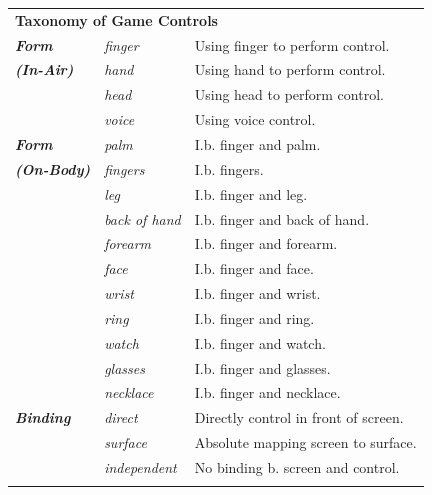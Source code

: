 \documentclass{sigchi}
\newcommand\tabhead[1]{\small\textbf{#1}}
\begin{document}
    \begin{table}
    \centering
    \begin{adjustwidth}{-0.4cm}{}
    \begin{tabular}{|l|l|l|}
      \hline
      \multicolumn{3}{|p{1.06\columnwidth}|}{\centering\tabhead{\textbf{Taxonomy of Game Controls}}}\\
      \Xhline{4\arrayrulewidth}
        \textbf{\em{Form}} & \em{finger} & Using finger to perform control.\\ \cline{2-3} 
        \textbf{\em{{\fontsize{0.3cm}{1em}\selectfont (In-Air)}}}  & \em{hand} & Using hand to perform control.\\ \cline{2-3} 
             & \em{head} & Using head to perform control.\\ \cline{2-3} 
             & \em{voice} & Using voice control.\\ 
      \Xhline{4\arrayrulewidth}
        \textbf{\em{Form}} & \em{palm} & I.b. finger and palm. \\ \cline{2-3} 
        \textbf{\em{{\fontsize{0.3cm}{1em}\selectfont (On-Body)}}} & \em{fingers} & I.b. fingers.\\ \cline{2-3} 
             & \em{leg} & I.b. finger and leg.\\ \cline{2-3} 
             & \em{back of hand} & I.b. finger and back of hand.\\ \cline{2-3} 
             & \em{forearm} & I.b. finger and forearm.\\ \cline{2-3} 
             & \em{face} & I.b. finger and face.\\ \cline{2-3} 
             & \em{wrist} & I.b. finger and wrist.\\ \cline{2-3} 
             & \em{ring} & I.b. finger and ring. \\ \cline{2-3} 
             & \em{watch} & I.b. finger and watch.\\ \cline{2-3} 
             & \em{glasses} & I.b. finger and glasses.\\ \cline{2-3} 
             & \em{necklace} & I.b. finger and necklace.\\ 
      \Xhline{4\arrayrulewidth}
        \textbf{\em{Binding}} & \em{direct} & Directly control in front of screen. \\ \cline{2-3} 
             & \em{surface} & Absolute mapping screen to surface.\\ \cline{2-3} 
             & \em{independent} & No binding b. screen and control.\\
      \Xhline{4\arrayrulewidth}

\end{tabular}
\end{adjustwidth}
\end{table}
\end{document}
